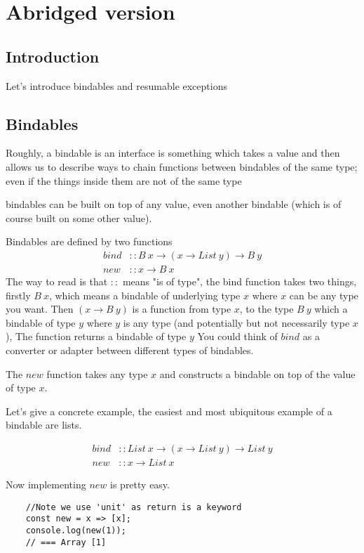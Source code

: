 \section{Abridged version}

\subsection{Introduction}
Let's introduce bindables and resumable exceptions

\subsection{Bindables}
Roughly, a bindable is an interface
is something which takes a value
and then allows us to describe ways to chain functions
between bindables of the same type;
even if the things inside them are not of the same type

bindables can be built on top of any value,
even another bindable
(which is of course built on some other value).

Bindables are defined by two functions
\begin{align}
    bind &:: B\ x \rightarrow (x \rightarrow List\ y) \rightarrow B\ y\\
    new &:: x \rightarrow B\ x
\end{align}
The way to read is that $::$ means "is of type",
the bind function takes two things,
firstly $B\ x$, which means a bindable of underlying type $x$
where $x$ can be any type you want.
Then $(x \rightarrow B\ y)$ is a function from type $x$,
to the type $B\ y$ which a bindable of type $y$
where $y$ is any type
(and potentially but not necessarily type $x$),
The function returns a bindable of type $y$
You could think of $bind$ as a converter
or adapter between different types of bindables.

The $new$ function takes any type $x$ and
constructs a bindable on top of the value of type $x$.

Let's give a concrete example,
the easiest and most ubiquitous example
of a bindable are lists.

\begin{align}
    bind &:: List\ x \rightarrow (x \rightarrow List\ y) \rightarrow List\ y\\
    new &:: x \rightarrow List\ x
\end{align}

Now implementing $new$ is pretty easy.
\begin{verbatim}
    //Note we use 'unit' as return is a keyword
    const new = x => [x];
    console.log(new(1));
    // === Array [1]
\end{verbatim}

